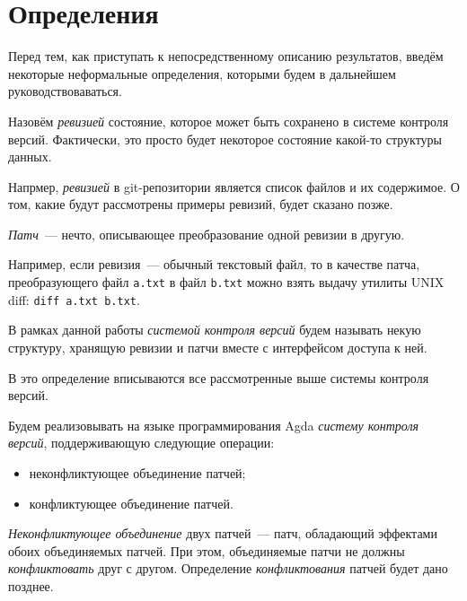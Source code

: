 
\section{Определения}

Перед тем, как приступать к непосредственному описанию результатов,
введём некоторые неформальные определения, которыми будем в дальнейшем
руководствоваваться. 

\begin{definition}[Ревизия]
  Назовём \emph{ревизией} состояние, которое может быть сохранено в
  системе контроля версий. Фактически, это просто будет некоторое
  состояние какой-то структуры данных.
\end{definition}

Напрмер, \emph{ревизией} в git-репозитории является список файлов и их
содержимое. О том, какие будут рассмотрены примеры ревизий, будет
сказано позже.

\begin{definition}[Патч]
  \emph{Патч}~--- нечто, описывающее преобразование одной ревизии в
  другую.
\end{definition}

Например, если ревизия~--- обычный текстовый файл, то в качестве
патча, преобразующего файл \texttt{a.txt} в файл \texttt{b.txt} можно
взять выдачу утилиты UNIX diff: \texttt{diff a.txt b.txt}. 

\begin{definition}
  В рамках данной работы \emph{системой контроля версий} будем
  называть некую структуру, хранящую ревизии и патчи вместе с
  интерфейсом доступа к ней.
\end{definition}

В это определение вписываются все рассмотренные выше системы контроля
версий. 

Будем реализовывать на языке программирования Agda \emph{систему
  контроля версий}, поддерживающую следующие операции:
\begin{itemize}
\item неконфликтующее объединение патчей;
\item конфликтующее объединение патчей.
\end{itemize}

\begin{definition}
  \emph{Неконфликтующее объединение} двух патчей~--- патч, обладающий
  эффектами обоих объединяемых патчей. При этом, объединяемые патчи не
  должны \emph{конфликтовать} друг с другом. Определение
  \emph{конфликтования} патчей будет дано позднее.
\end{definition}

